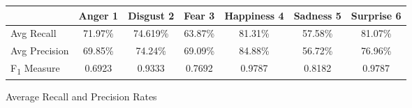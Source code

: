 \begin{figure}[h]
\begin{center}
\caption{Average Recall and Precision Rates}
\begin{tabular}{ | l || c | c | c | c | c | c | }
    \hline
          & Anger 1 & Disgust 2 & Fear 3 & Happiness 4 & Sadness 5 & Surprise 6 \\ \hline \hline
        Avg Recall & 71.97\% & 74.619\% & 63.87\% & 81.31\% & 57.58\% & 81.07\% \\ \hline
        Avg Precision & 69.85\% & 74.24\% & 69.09\%  & 84.88\% & 56.72\% & 76.96\% \\ \hline
        F\textsubscript{1} Measure & 0.6923 & 0.9333 & 0.7692 & 0.9787 & 0.8182 &
        0.9787 \\ \hline
    \end{tabular}
    \label{fig:averageRecall}
\end{center}
\end{figure}
